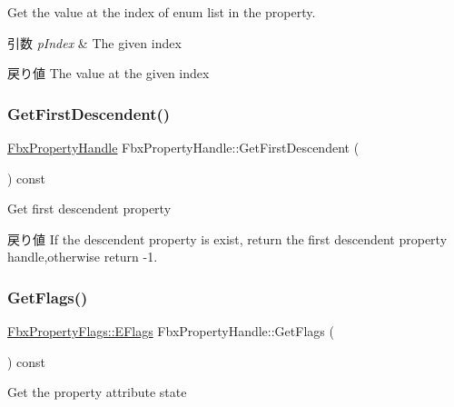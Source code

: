 Get the value at the index of enum list in the property. 
\begin{DoxyParams}{引数}
{\em p\+Index} & The given index \\
\hline
\end{DoxyParams}
\begin{DoxyReturn}{戻り値}
The value at the given index 
\end{DoxyReturn}
\mbox{\label{class_fbx_property_handle_a89892765ba818c194c4615bb84ea0c8c}} 
\subsubsection{\texorpdfstring{Get\+First\+Descendent()}{GetFirstDescendent()}}
{\footnotesize\ttfamily \hyperlink{class_fbx_property_handle}{Fbx\+Property\+Handle} Fbx\+Property\+Handle\+::\+Get\+First\+Descendent (\begin{DoxyParamCaption}{ }\end{DoxyParamCaption}) const}

Get first descendent property \begin{DoxyReturn}{戻り値}
If the descendent property is exist, return the first descendent property handle,otherwise return -\/1. 
\end{DoxyReturn}
\mbox{\label{class_fbx_property_handle_a3283a9c3b0cca5cdb058751a90d794c2}} 
\subsubsection{\texorpdfstring{Get\+Flags()}{GetFlags()}}
{\footnotesize\ttfamily \hyperlink{class_fbx_property_flags_afabfa7e0949aac8a7dcdf8a141867e99}{Fbx\+Property\+Flags\+::\+E\+Flags} Fbx\+Property\+Handle\+::\+Get\+Flags (\begin{DoxyParamCaption}{ }\end{DoxyParamCaption}) const}



Get the property attribute state 

\mbox{\label{class_fbx_property_handle_a90978a4383e1fc31bca8944dc35e39cd}} 
